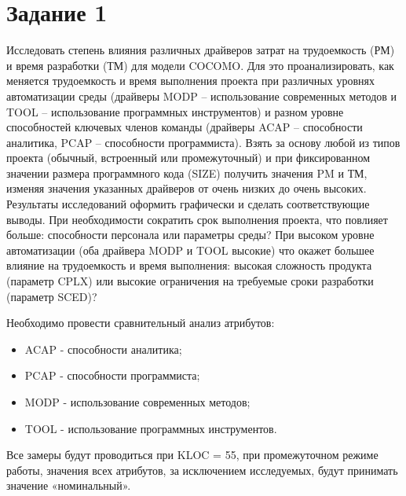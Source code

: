 \section*{Задание 1}
Исследовать степень влияния различных драйверов затрат на трудоемкость (РМ) и время разработки (ТМ) для модели COCOMO. Для это проанализировать, как меняется трудоемкость и время выполнения проекта при различных уровнях автоматизации среды (драйверы MODP – использование современных методов и TOOL – использование программных инструментов) и разном уровне способностей ключевых членов команды (драйверы ACAP – способности аналитика, PCAP – способности программиста). Взять за основу любой из типов проекта (обычный, встроенный или промежуточный) и при фиксированном значении размера программного кода (SIZE) получить значения PM и ТМ, изменяя значения указанных драйверов от очень низких до очень высоких. Результаты исследований оформить графически и сделать соответствующие выводы. При необходимости сократить срок выполнения проекта, что повлияет больше: способности персонала или параметры среды? При высоком уровне автоматизации (оба драйвера MODP и TOOL высокие) что окажет большее влияние на трудоемкость и время выполнения: высокая сложность продукта (параметр CPLX) или высокие ограничения на требуемые сроки разработки (параметр SCED)?

Необходимо провести сравнительный анализ атрибутов:
\begin{itemize}
	\item ACAP - способности аналитика;
	\item PCAP - способности программиста;
	\item MODP - использование современных методов;
	\item TOOL - использование программных инструментов.
\end{itemize}

Все замеры будут проводиться при KLOC = 55, при промежуточном режиме работы, значения всех атрибутов, за
исключением исследуемых, будут принимать значение «номинальный».

